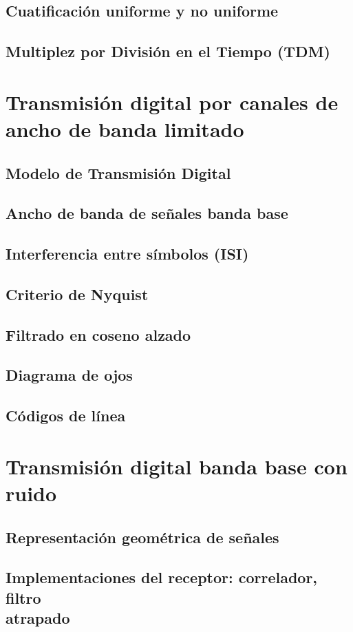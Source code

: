 \documentclass[a4paper]{book}
\begin{document}
\section{Cuatificación uniforme y no uniforme}
\section{Multiplez por División en el Tiempo (TDM)}

\chapter{Transmisión digital por canales de ancho de banda limitado}
\section{Modelo de Transmisión Digital}
\section{Ancho de banda de señales banda base}
\section{Interferencia entre símbolos (ISI)}
\section{Criterio de Nyquist}
\section{Filtrado en coseno alzado}
\section{Diagrama de ojos}
\section{Códigos de línea}

\chapter{Transmisión digital banda base con ruido}
\section{Representación geométrica de señales}
\section{\texorpdfstring{Implementaciones del receptor: correlador, filtro\\ atrapado}{Implementaciones del receptor: correlador, filtro atrapado}}
\end{document}
